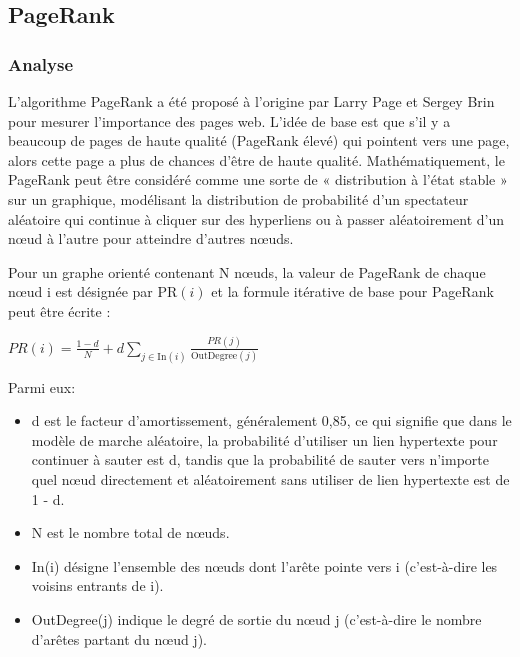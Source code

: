 \documentclass[11pt,english]{article}
\begin{document}
{    \subsection{PageRank}

    \subsubsection{Analyse}
    
    \indent 

    L'algorithme PageRank a été proposé à l'origine par Larry Page et Sergey Brin pour mesurer l'importance des pages web. L'idée de base est que s'il y a beaucoup de pages de haute qualité (PageRank élevé) qui pointent vers une page, alors cette page a plus de chances d'être de haute qualité. Mathématiquement, le PageRank peut être considéré comme une sorte de « distribution à l'état stable » sur un graphique, modélisant la distribution de probabilité d'un spectateur aléatoire qui continue à cliquer sur des hyperliens ou à passer aléatoirement d'un nœud à l'autre pour atteindre d'autres nœuds.

    \indent Pour un graphe orienté contenant N nœuds, la valeur de PageRank de chaque nœud i est désignée par PR$(i)$ et la formule itérative de base pour PageRank peut être écrite :

    \begin{center}
        $PR(i) = \frac{1 - d}{N} + d \sum_{j \in \mathrm{In}(i)} \frac{PR(j)}{\mathrm{OutDegree}(j)}$
    \end{center}

    \indent Parmi eux:

    \begin{itemize}
        \item d est le facteur d'amortissement, généralement 0,85, ce qui signifie que dans le modèle de marche aléatoire, la probabilité d'utiliser un lien hypertexte pour continuer à sauter est d, tandis que la probabilité de sauter vers n'importe quel nœud directement et aléatoirement sans utiliser de lien hypertexte est de 1 - d.
        \item N est le nombre total de nœuds.
        \item In(i) désigne l'ensemble des nœuds dont l'arête pointe vers i (c'est-à-dire les voisins entrants de i).
        \item OutDegree(j) indique le degré de sortie du nœud j (c'est-à-dire le nombre d'arêtes partant du nœud j).
    \end{itemize}

}
\end{document}
